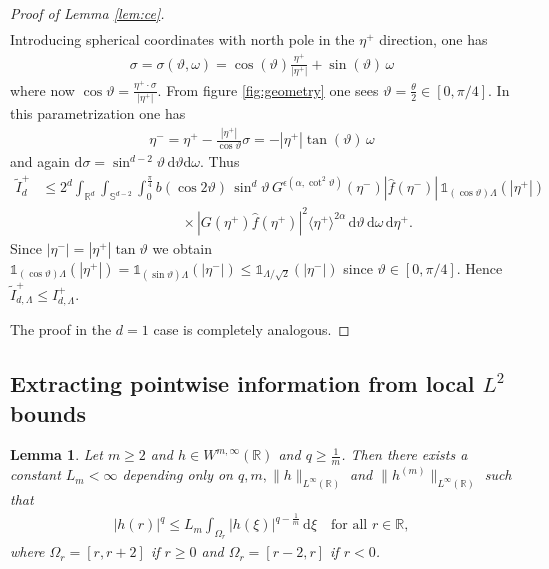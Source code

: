 \documentclass[11pt,a4paper,reqno]{amsart}
\theoremstyle{plain}
\newtheorem{lemma}[proposition]{Lemma}
\theoremstyle{definition}
\begin{document}
\begin{proof}[Proof of Lemma \ref{lem:ce}]
\begin{align*}
\end{align*}
Introducing spherical coordinates with north pole in the $\eta^+$ direction, one has
\begin{align*}
	\sigma =\sigma(\vartheta,\omega)= \cos(\vartheta) \frac{\eta^+}{|\eta^+|} + \sin (\vartheta)\, \omega
\end{align*}
where now $\cos\vartheta= \tfrac{\eta^+\cdot\sigma}{|\eta^+|}$. From figure \ref{fig:geometry} one sees
$\vartheta =\tfrac{\theta}{2}\in [0,\pi/4]$. In this parametrization one  has
\begin{align*}
	\eta^- = \eta^+ - \frac{|\eta^+|}{\cos\vartheta}\sigma
		= - |\eta^+|\tan(\vartheta)\, \omega
\end{align*}
and again
$\mathrm{d}\sigma = \sin^{d-2}\vartheta \,\mathrm{d}\vartheta\mathrm{d}\omega$.
Thus
\begin{align*}
	\widetilde{I}_d^+ &\leq 2^{d} \int_{{\mathbb{R}}^d} \int_{{\mathbb{S}}^{d-2}} \int_0^{\frac{\pi}{4}} b\left( \cos 2\vartheta\right)  \, \sin^d \vartheta \, G^{\epsilon\left(\alpha, \cot^2\vartheta\right)}(\eta^-) |\hat{f}(\eta^-)|\, {\mathds{1}}_{(\cos\vartheta) \Lambda}(|\eta^+|)\\  & \qquad \qquad \qquad \qquad \qquad  \times |G(\eta^+) \hat{f}(\eta^+)|^2 \langle\eta^+\rangle^{2\alpha} \, \mathrm{d}\vartheta\,\mathrm{d}\omega \,\mathrm{d}\eta^+.
\end{align*}
Since $|\eta^-|=  |\eta^+| \tan\vartheta$ we obtain ${\mathds{1}}_{(\cos\vartheta)\Lambda}(|\eta^+|) = {\mathds{1}}_{(\sin\vartheta)\Lambda}(|\eta^-|) \leq {\mathds{1}}_{\Lambda/\sqrt{2}}(|\eta^-|)$ since $\vartheta\in [0,\pi/4]$. Hence $\widetilde{I}_{d,\Lambda}^+\le I_{d,\Lambda}^+$.

The proof in the $d=1$ case is completely analogous.
\end{proof}

\subsection{Extracting pointwise information from local $L^2$ bounds}

\begin{lemma}\label{lem:1dlemma}
	Let $m\geq 2$ and $h\in W^{m, \infty}({\mathbb{R}})$ and $q\geq \frac{1}{m}$. 
	Then there exists a constant $L_{m}<\infty$ depending only on $q, m, \|h\|_{L^{\infty}({\mathbb{R}})}$ and $\|h^{(m)}\|_{L^{\infty}({\mathbb{R}})}$ such that
	\begin{align*}
		|h(r)|^{q} \leq L_{m} \int_{\Omega_r} |h(\xi)|^{q-\tfrac{1}{m}}\,\mathrm{d}\xi \quad \text{for all } r\in{\mathbb{R}},
	\end{align*}
	where $\Omega_r = [r, r+2]$ if $r\geq 0$ and $\Omega_r = [r-2, r]$ if $r<0$.
\end{lemma}
\end{document}
